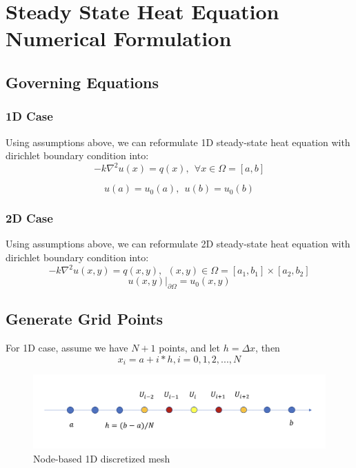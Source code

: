 \documentclass[a4paper]{article}
\begin{document}
\section{Steady State Heat Equation Numerical Formulation}
\subsection{Governing Equations}
\subsubsection{1D Case}
Using assumptions above, we can reformulate 1D steady-state heat equation with dirichlet boundary condition into:
\begin{equation}
    -k\nabla^2u(x) = q(x), ~~\forall x\in \Omega = [a,b]
\end{equation}

\begin{equation}
    u(a) = u_0(a), ~~u(b) = u_0(b)
\end{equation}

\subsubsection{2D Case}
Using assumptions above, we can reformulate 2D steady-state heat equation with dirichlet boundary condition into:
\begin{equation}
    -k\nabla^2u(x,y) = q(x,y), ~~(x,y)\in \Omega = [a_1,b_1] \times [a_2,b_2]
\end{equation}
\begin{equation}
    u(x,y)|_{\partial\Omega} = u_0(x,y)
\end{equation}

\subsection{Generate Grid Points}
For 1D case, assume we have $N+1$ points, and let $h=\Delta x$, then 
    $$x_i = a + i*h, i = 0,1,2,...,N$$
    
\begin{figure}
\includegraphics[width=1\textwidth]{1d.png}
\caption{\label{1d}Node-based 1D discretized mesh}
\end{figure}
\end{document}
